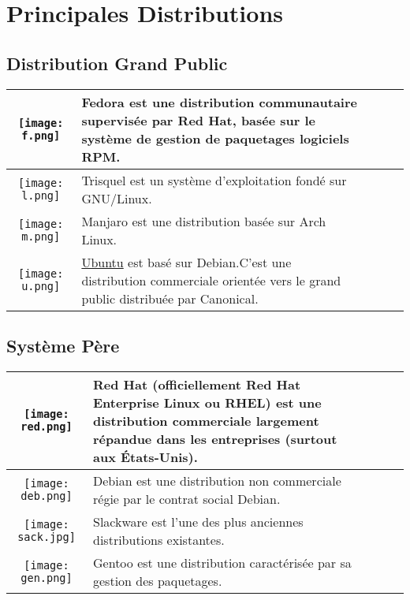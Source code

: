 \documentclass{beamer}
\begin{document}
\section{Principales Distributions}
\subsection{Distribution Grand Public }
\begin{frame}
\begin{tabular}{|c|p{8cm}|p{8cm}|p{8cm}|p{8cm}|}
\hline
\texttt{[image: f.png]} & Fedora est une distribution communautaire supervisée par Red Hat, basée sur le système de gestion de paquetages logiciels RPM.\\
\hline
\texttt{[image: l.png]} & Trisquel est un système d’exploitation fondé sur GNU/Linux.\\
  \hline
  \texttt{[image: m.png]} &  Manjaro  est une distribution basée sur Arch Linux.\\
  \hline
   \centering\texttt{[image: u.png]} & \href{https://fr.wikipedia.org/wiki/Ubuntu}{Ubuntu} est basé sur Debian.C'est une distribution commerciale orientée vers le grand public distribuée par Canonical.\\
   \hline
\end{tabular}
\end{frame}
\subsection{Système P\`ere}
\begin{frame}
\begin{tabular}{|c|p{8cm}|p{8cm}|p{8cm}|p{8cm}|}
\hline
\texttt{[image: red.png]} & Red Hat (officiellement Red Hat Enterprise Linux ou RHEL) est une distribution commerciale largement répandue dans les entreprises (surtout aux États-Unis).\\
\hline
\texttt{[image: deb.png]} & Debian est une distribution non commerciale régie par le contrat social Debian. \\
\hline
\texttt{[image: sack.jpg]} & Slackware est l'une des plus anciennes distributions existantes.\\
\hline
\texttt{[image: gen.png]} & Gentoo est une distribution caractérisée par sa gestion des paquetages.\\
\hline
\end{tabular}
\end{frame}
\end{document}
